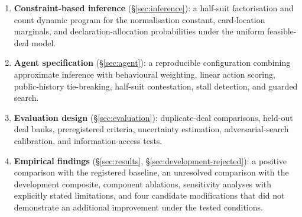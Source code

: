 \begin{enumerate}
\item \textbf{Constraint-based inference} (\S\ref{sec:inference}): a half-suit factorisation and
  count dynamic program for the normalisation constant, card-location marginals, and
  declaration-allocation probabilities under the uniform feasible-deal model.

\item \textbf{Agent specification} (\S\ref{sec:agent}): a reproducible configuration combining
  approximate inference with behavioural weighting, linear action scoring, public-history
  tie-breaking, half-suit contestation, stall detection, and guarded search.

\item \textbf{Evaluation design} (\S\ref{sec:evaluation}): duplicate-deal comparisons, held-out
  deal banks, preregistered criteria, uncertainty estimation, adversarial-search calibration, and
  information-access tests.

\item \textbf{Empirical findings} (\S\ref{sec:results}, \S\ref{sec:development-rejected}): a
  positive comparison with the registered baseline, an unresolved comparison with the development
  composite, component ablations, sensitivity analyses with explicitly stated limitations, and four
  candidate modifications that did not demonstrate an additional improvement under the tested
  conditions.
\end{enumerate}
